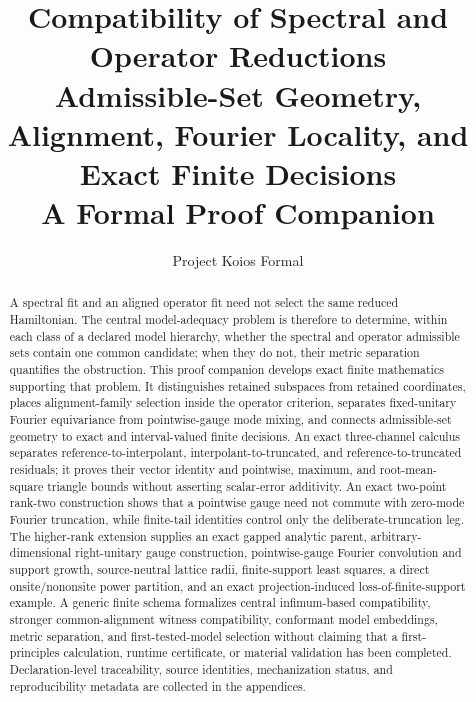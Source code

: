 \documentclass[11pt]{report}
\title{Compatibility of Spectral and Operator Reductions\\
\large Admissible-Set Geometry, Alignment, Fourier Locality, and Exact Finite Decisions\\[0.5em]
\normalsize A Formal Proof Companion}
\author{Project Koios Formal}
\date{}
\theoremstyle{definition}
\theoremstyle{remark}
\begin{document}
\hypersetup{pageanchor=false}
\maketitle

\begin{abstract}
A spectral fit and an aligned operator fit need not select the same reduced Hamiltonian.
The central model-adequacy problem is therefore to determine, within each class of a
declared model hierarchy, whether the spectral and operator admissible sets contain one
common candidate; when they do not, their metric separation quantifies the obstruction.
This proof companion develops exact finite mathematics supporting that problem. It
distinguishes retained subspaces from retained coordinates, places alignment-family
selection inside the operator criterion, separates fixed-unitary Fourier equivariance
from pointwise-gauge mode mixing, and connects admissible-set geometry to exact and
interval-valued finite decisions. An exact three-channel calculus separates
reference-to-interpolant, interpolant-to-truncated, and reference-to-truncated residuals;
it proves their vector identity and pointwise, maximum, and root-mean-square triangle
bounds without asserting scalar-error additivity. An exact two-point rank-two
construction shows that a pointwise gauge need not commute with zero-mode Fourier
truncation, while finite-tail identities control only the deliberate-truncation leg.
The higher-rank extension supplies an exact gapped analytic parent, arbitrary-dimensional
right-unitary gauge construction, pointwise-gauge Fourier convolution and support growth,
source-neutral lattice radii, finite-support least squares, a direct onsite/nononsite power
partition, and an exact projection-induced loss-of-finite-support example. A generic finite
schema formalizes central infimum-based compatibility, stronger common-alignment witness
compatibility, conformant model embeddings, metric separation, and first-tested-model
selection without claiming that a first-principles calculation, runtime certificate, or
material validation has been completed. Declaration-level traceability, source identities,
mechanization status, and reproducibility metadata are collected in the appendices.
\end{abstract}

\clearpage
\hypersetup{pageanchor=true}
\tableofcontents
\clearpage
{}







\end{document}

